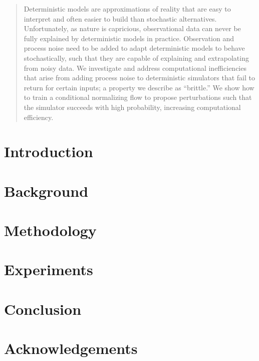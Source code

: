 \documentclass[twoside]{article}
\begin{document}

\begin{abstract}
Deterministic models are approximations of reality that are easy to interpret and often easier to build than stochastic alternatives.  
Unfortunately, as nature is capricious, observational data can never be fully explained by deterministic models in practice.  
Observation and process noise need to be added to adapt deterministic models to behave stochastically, such that they are capable of explaining and extrapolating from noisy data.
We investigate and address computational inefficiencies that arise from adding process noise to deterministic simulators that fail to return for certain inputs; a property we describe as ``brittle.''
We show how to train a conditional normalizing flow to propose perturbations such that the simulator succeeds with high probability, increasing computational efficiency.
\end{abstract}

\section{Introduction}


\section{Background}


\section{Methodology}


\section{Experiments}


\section{Conclusion}


\newpage

\section{Acknowledgements}




\end{document}
